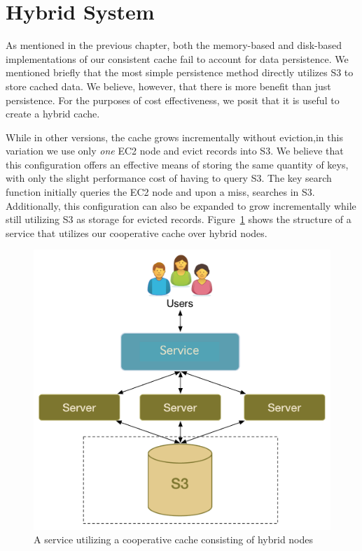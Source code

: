 \section{Hybrid System} %
\label{sec:hybrid_system}
As mentioned in the previous chapter, both the memory-based and disk-based
implementations of our consistent cache fail to account for data persistence.
We mentioned briefly that the most simple persistence method directly utilizes
S3 to store cached data. We believe, however, that there is more benefit than
just persistence. For the purposes of cost effectiveness, we posit that it is
useful to create a hybrid cache.

While in other versions, the cache grows incrementally without eviction,in this
variation we use only \emph{one} EC2 node and evict records into S3. We believe
that this configuration offers an effective means of storing the same quantity
of keys, with only the slight performance cost of having to query S3. The key
search function initially queries the EC2 node and upon a miss, searches in
S3. Additionally, this configuration can also be expanded to grow incrementally
while still utilizing S3 as storage for evicted records.
Figure~\ref{fig:hybrid_setup} shows the structure of a service that utilizes
our cooperative cache over hybrid nodes.

\begin{figure}
\begin{center}
\includegraphics[scale=0.5]{figures/auspice_setup.pdf}
\end{center}
\caption{A service utilizing a cooperative cache consisting of hybrid nodes}
\label{fig:hybrid_setup}
\end{figure}

